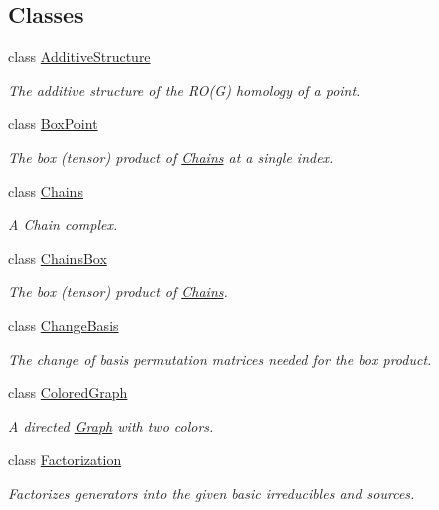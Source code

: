 \subsection*{Classes}
\begin{DoxyCompactItemize}
\item 
class \hyperlink{classMackey_1_1AdditiveStructure}{Additive\+Structure}
\begin{DoxyCompactList}\small\item\em The additive structure of the R\+O(\+G) homology of a point. \end{DoxyCompactList}\item 
class \hyperlink{classMackey_1_1BoxPoint}{Box\+Point}
\begin{DoxyCompactList}\small\item\em The box (tensor) product of \hyperlink{classMackey_1_1Chains}{Chains} at a single index. \end{DoxyCompactList}\item 
class \hyperlink{classMackey_1_1Chains}{Chains}
\begin{DoxyCompactList}\small\item\em A Chain complex. \end{DoxyCompactList}\item 
class \hyperlink{classMackey_1_1ChainsBox}{Chains\+Box}
\begin{DoxyCompactList}\small\item\em The box (tensor) product of \hyperlink{classMackey_1_1Chains}{Chains}. \end{DoxyCompactList}\item 
class \hyperlink{classMackey_1_1ChangeBasis}{Change\+Basis}
\begin{DoxyCompactList}\small\item\em The change of basis permutation matrices needed for the box product. \end{DoxyCompactList}\item 
class \hyperlink{classMackey_1_1ColoredGraph}{Colored\+Graph}
\begin{DoxyCompactList}\small\item\em A directed \hyperlink{classMackey_1_1Graph}{Graph} with two colors. \end{DoxyCompactList}\item 
class \hyperlink{classMackey_1_1Factorization}{Factorization}
\begin{DoxyCompactList}\small\item\em Factorizes generators into the given basic irreducibles and sources. \end{DoxyCompactList}\item 

\end{DoxyCompactItemize}
